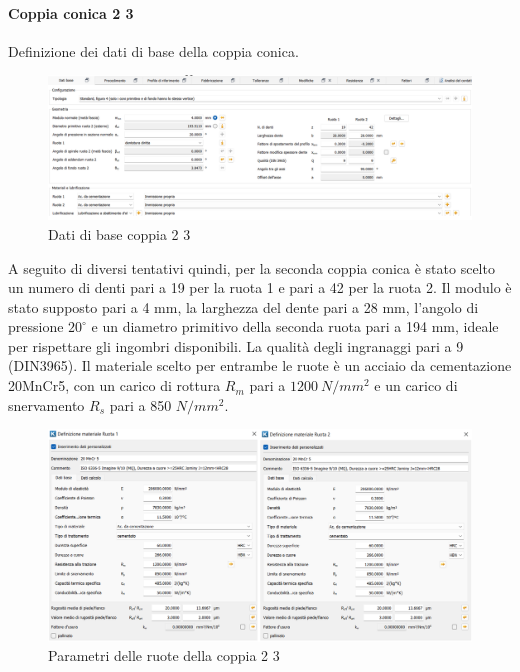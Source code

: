\paragraph{Coppia conica 2 3}Definizione dei dati di base della coppia conica.  
\begin{figure}[h]
    \centering
    \includegraphics[scale=0.45]{Immagini/Coppia23.png}
    \caption{Dati di base coppia 2 3}
    \label{fig:Coppia23}
\end{figure}
\newpage
A seguito di diversi tentativi quindi, per la seconda coppia conica è stato scelto un numero di denti pari a 19 per la ruota 1 e pari a 42 per la ruota 2. Il modulo è stato supposto pari a 4 mm, la larghezza del dente pari a 28 mm, l’angolo di pressione $20^\circ$ e un diametro primitivo della seconda ruota pari a 194 mm, ideale per rispettare gli ingombri disponibili. La qualità degli ingranaggi pari a 9 (DIN3965). Il materiale scelto per entrambe le ruote è un acciaio da cementazione 20MnCr5, con un carico di rottura $R_m$ pari a $1200\ N/mm^2$ e un carico di snervamento $R_s$ pari a 850 $N/mm^2$. 
\begin{figure}[h]
    \centering
    \includegraphics[scale=0.5]{Immagini/RuoteCoppia23.png}
    \caption{Parametri delle ruote della coppia 2 3}
    \label{fig:RuoteCoppia23}
\end{figure}

